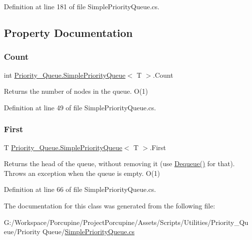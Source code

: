 Definition at line 181 of file Simple\+Priority\+Queue.\+cs.



\subsection{Property Documentation}
\mbox{\label{class_priority___queue_1_1_simple_priority_queue_a366f0a020200ba48e64afe8064ef014c}} 
\subsubsection{\texorpdfstring{Count}{Count}}
{\footnotesize\ttfamily int \hyperlink{class_priority___queue_1_1_simple_priority_queue}{Priority\+\_\+\+Queue.\+Simple\+Priority\+Queue}$<$ T $>$.Count\hspace{0.3cm}{\ttfamily [get]}}



Returns the number of nodes in the queue. O(1) 



Definition at line 49 of file Simple\+Priority\+Queue.\+cs.

\mbox{\label{class_priority___queue_1_1_simple_priority_queue_ab8d3592674c629038086a006069bb9dd}} 
\subsubsection{\texorpdfstring{First}{First}}
{\footnotesize\ttfamily T \hyperlink{class_priority___queue_1_1_simple_priority_queue}{Priority\+\_\+\+Queue.\+Simple\+Priority\+Queue}$<$ T $>$.First\hspace{0.3cm}{\ttfamily [get]}}



Returns the head of the queue, without removing it (use \hyperlink{class_priority___queue_1_1_simple_priority_queue_ad17b59ab99b074c9f697fee41b7583c3}{Dequeue()} for that). Throws an exception when the queue is empty. O(1) 



Definition at line 66 of file Simple\+Priority\+Queue.\+cs.



The documentation for this class was generated from the following file\+:\begin{DoxyCompactItemize}
\item 
G\+:/\+Workspace/\+Porcupine/\+Project\+Porcupine/\+Assets/\+Scripts/\+Utilities/\+Priority\+\_\+\+Queue/\+Priority Queue/\hyperlink{_simple_priority_queue_8cs}{Simple\+Priority\+Queue.\+cs}\end{DoxyCompactItemize}
